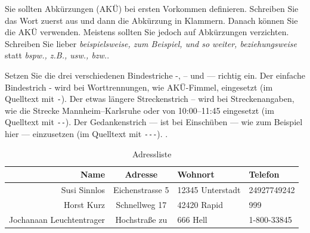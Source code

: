 \documentclass[11pt,a4paper]{report}
\begin{document}
Sie sollten Abkürzungen (AKÜ) bei ersten Vorkommen definieren.
Schreiben Sie das Wort zuerst aus und dann die Abkürzung in 
Klammern. 
Danach können Sie die AKÜ verwenden. 
Meistens sollten Sie jedoch auf Abkürzungen verzichten.
Schreiben Sie lieber
\textit{beispielsweise, zum Beispiel, und so weiter, beziehungsweise}
statt \textit{bspw., z.B., usw., bzw.}.

Setzen Sie die drei verschiedenen Bindestriche -, -- und --- richtig
ein. 
Der einfache Bindestrich - wird bei Worttrennungen, 
wie AKÜ-Fimmel, eingesetzt (im Quelltext mit \verb|-|).
Der etwas längere Streckenstrich -- wird bei Streckenangaben, wie
die Strecke Mannheim--Karlsruhe oder von 10:00--11:45 eingesetzt
(im Quelltext mit \verb|--|).
Der Gedankenstrich --- ist bei Einschüben --- wie zum Beispiel
hier --- einzusetzen (im Quelltext mit \verb|---|).
.



\begin{table}[htbp] %
\centering
\begin{tabular}{|r|c|l|l|}
\hline
\textbf{Name} & \textbf{Adresse} & \textbf{Wohnort} & \textbf{Telefon} \\ 
\hline\hline
Susi Sinnlos & Eichenstrasse 5 & 12345 Unterstadt & 24927749242 \\
Horst Kurz & Schnellweg 17 & 42420 Rapid & 999 \\\hline
Jochanaan Leuchtentrager & Hochstraße zu & 666 Hell & 1-800-33845\\\hline
\end{tabular}
\caption{Adressliste}
\label{tab:meinetab}
\end{table}
\end{document}
